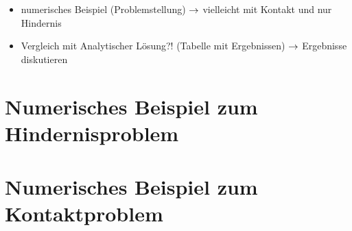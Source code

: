 
\begin{itemize}
\item numerisches Beispiel (Problemstellung) $\rightarrow$ vielleicht mit Kontakt und nur Hindernis
\item Vergleich mit Analytischer Lösung?! (Tabelle mit Ergebnissen) $\rightarrow$ Ergebnisse diskutieren
\end{itemize}

\section{Numerisches Beispiel zum Hindernisproblem}

\section{Numerisches Beispiel zum Kontaktproblem}

\newpage

